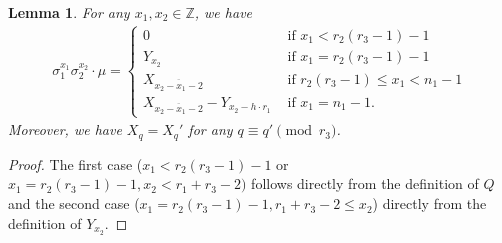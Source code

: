 \documentclass[12pt,a4paper]{article}
\newtheorem{lemma}[theorem]{Lemma}
\theoremstyle{definition}
\newcommand{\Z}{\mathbb{Z}}
\newcommand{\lcm}{\mathrm{lcm}}
\begin{document}
\begin{lemma}\label{XY}
For any $x_1,x_2\in\Z$, we have %
\begin{align*}
\sigma_1^{x_1}\sigma_2^{x_2}\cdot \mu=
\begin{cases}
0   &\text{ if }  x_1<r_2(r_3-1)-1\\
Y_{x_2} \quad &\text{ if } x_1=r_2(r_3-1)-1 \\
X_{\overline{x_2-x_1-2}}  \quad &\text{ if } r_2(r_3-1)\leq x_1<n_1-1 \\
X_{\overline{x_2-x_1-2}}-Y_{x_2-h\cdot r_1} &\text{ if }  x_1=n_1-1.
\end{cases}
\end{align*}
Moreover, we have $X_q=X_q'$ for any $q\equiv q'\pmod {r_3}$.
\end{lemma}
\begin{proof}
The first case ($x_1<r_2(r_3-1)-1$ or  $x_1=r_2(r_3-1)-1, x_2< r_1+r_3-2)$ follows directly from the definition of $Q$ and the second case ($x_1=r_2(r_3-1)-1, r_1+r_3-2\leq x_2$) directly from the definition of $Y_{x_2}$.

\end{proof}
\end{document}
